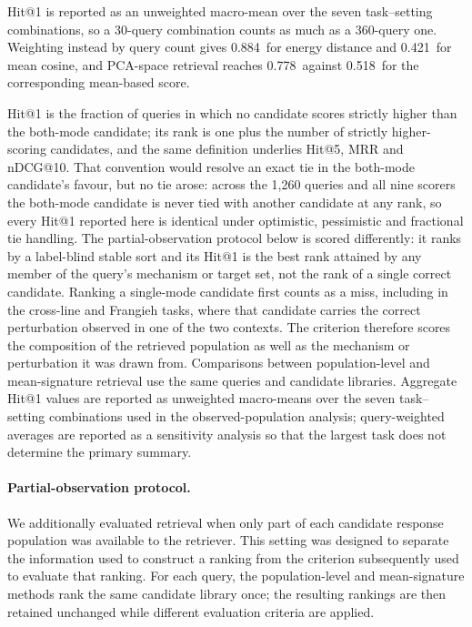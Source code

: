 \documentclass[11pt,letterpaper]{article}
\newcommand{\HITPCADIST}{0.778}
\newcommand{\HITPCAMEAN}{0.518}
\newcommand{\HITENERGYW}{0.884}
\newcommand{\HITMEANW}{0.421}
\begin{document}
Hit@1 is reported as an unweighted macro-mean over the seven task--setting combinations, so a
30-query combination counts as much as a 360-query one. Weighting instead by query count gives
\HITENERGYW\ for energy distance and \HITMEANW\ for mean cosine, and PCA-space retrieval reaches
\HITPCADIST\ against \HITPCAMEAN\ for the corresponding mean-based score.

Hit@1 is the fraction of queries in which no candidate scores strictly higher than the both-mode
candidate; its rank is one plus the number of strictly higher-scoring candidates, and the same
definition underlies Hit@5, MRR and nDCG@10. That convention would resolve an exact tie in the
both-mode candidate's favour, but no tie arose: across the 1,260 queries and all nine scorers the
both-mode candidate is never tied with another candidate at any rank, so every Hit@1 reported here
is identical under optimistic, pessimistic and fractional tie handling. The partial-observation protocol below is scored differently: it ranks by a label-blind stable
sort and its Hit@1 is the best rank attained by any member of the query's mechanism or target set,
not the rank of a single correct candidate. Ranking a single-mode candidate first counts as a miss, including in the cross-line and
Frangieh tasks, where that candidate carries the correct perturbation observed in one of the two
contexts. The criterion therefore scores the composition of the retrieved population as well as the
mechanism or perturbation it was drawn from.
Comparisons between population-level and mean-signature retrieval use the same queries and
candidate libraries. Aggregate Hit@1 values are reported as unweighted macro-means over the seven
task--setting combinations used in the observed-population analysis; query-weighted averages are
reported as a sensitivity analysis so that the largest task does not determine the primary summary.

\paragraph{Partial-observation protocol.}
We additionally evaluated retrieval when only part of each candidate response population was
available to the retriever. This setting was designed to separate the information used to construct
a ranking from the criterion subsequently used to evaluate that ranking. For each query, the
population-level and mean-signature methods rank the same candidate library once; the resulting
rankings are then retained unchanged while different evaluation criteria are applied.
\end{document}
